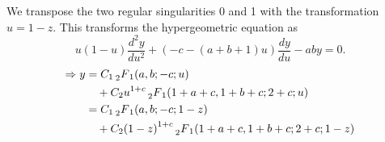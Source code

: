 \item

We transpose the two regular singularities 0 and 1 with the transformation $u = 1 - z$.
This transforms the hypergeometric equation as
\[
    u (1 - u) \frac{d^2 y}{du^2}
    + \left( -c - (a + b + 1) u \right) \frac{dy}{du}
    - ab y
    = 0.
\]
\begin{align*}
    \Rightarrow y
    &= C_1 \prescript{}{2}{F}_{1} (a, b; -c; u) \\
    &\quad + C_2 u^{1 + c} \prescript{}{2}{F}_{1} (1+a+c, 1+b+c; 2+c; u) \\
    &= C_1 \prescript{}{2}{F}_{1}(a, b; -c; 1-z) \\
    &\quad + C_2 {(1 - z)}^{1 + c} \prescript{}{2}{F}_{1} (1+a+c, 1+b+c; 2+c; 1-z)
\end{align*}
